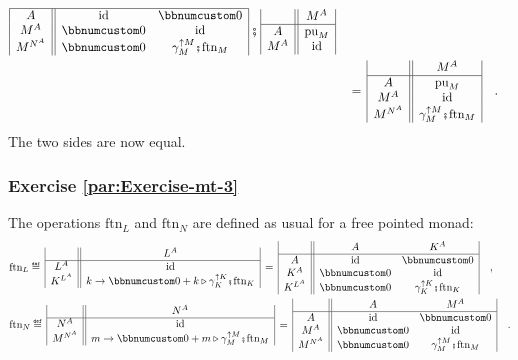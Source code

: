 \begin{align*}
\begin{array}{|c||cc|}
\hline A & \text{id} & \bbnum 0\\
M^{A} & \bbnum 0 & \text{id}\\
M^{N^{A}} & \bbnum 0 & \gamma_{M}^{\uparrow M}\bef\text{ftn}_{M}
\end{array}\,\bef\,\begin{array}{|c||c|}
 & M^{A}\\
\hline A & \text{pu}_{M}\\
M^{A} & \text{id}
\end{array}\\
 & \quad=\,\begin{array}{|c||c|}
 & M^{A}\\
\hline A & \text{pu}_{M}\\
M^{A} & \text{id}\\
M^{N^{A}} & \gamma_{M}^{\uparrow M}\bef\text{ftn}_{M}
\end{array}\quad.
\end{align*}
The two sides are now equal.

\subsubsection*{Exercise \ref{par:Exercise-mt-3}}

The operations $\text{ftn}_{L}$ and $\text{ftn}_{N}$ are defined
as usual for a free pointed monad:
\begin{align*}
 & \text{ftn}_{L}\triangleq\,\begin{array}{|c||c|}
 & L^{A}\\
\hline L^{A} & \text{id}\\
K^{L^{A}} & k\rightarrow\bbnum 0+k\triangleright\gamma_{K}^{\uparrow K}\bef\text{ftn}_{K}
\end{array}\,=\,\begin{array}{|c||cc|}
 & A & K^{A}\\
\hline A & \text{id} & \bbnum 0\\
K^{A} & \bbnum 0 & \text{id}\\
K^{L^{A}} & \bbnum 0 & \gamma_{K}^{\uparrow K}\bef\text{ftn}_{K}
\end{array}\quad,\\
 & \text{ftn}_{N}\triangleq\,\begin{array}{|c||c|}
 & N^{A}\\
\hline N^{A} & \text{id}\\
M^{N^{A}} & m\rightarrow\bbnum 0+m\triangleright\gamma_{M}^{\uparrow M}\bef\text{ftn}_{M}
\end{array}\,=\,\begin{array}{|c||cc|}
 & A & M^{A}\\
\hline A & \text{id} & \bbnum 0\\
M^{A} & \bbnum 0 & \text{id}\\
M^{N^{A}} & \bbnum 0 & \gamma_{M}^{\uparrow M}\bef\text{ftn}_{M}
\end{array}\quad.
\end{align*}

